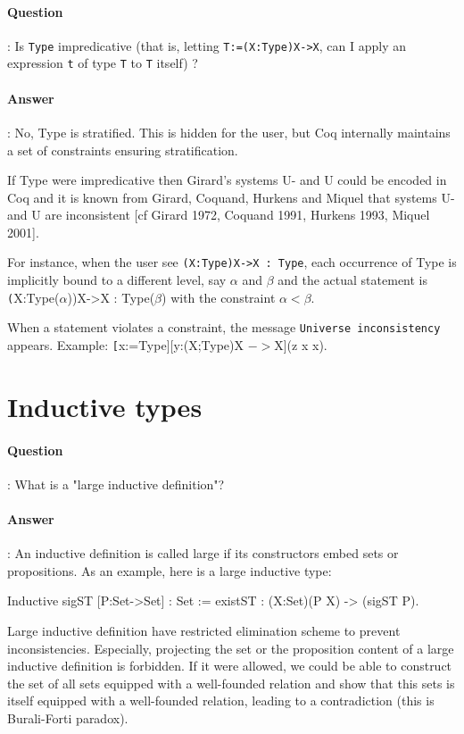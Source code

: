 \documentclass{article}
\newcommand{\coqtt}[1]{{\tt #1}}
\newcommand{\coqimp}{{$->$}}
\begin{document}
\paragraph{Question}: Is \coqtt{Type} impredicative (that is, letting
\coqtt{T:=(X:Type)X->X}, can I apply an expression \coqtt{t} of type \coqtt{T} to \coqtt{T} itself) ?

\paragraph{Answer}: No, Type is stratified. This is hidden for the
user, but Coq internally maintains a set of constraints ensuring
stratification.

  If Type were impredicative then Girard's systems U- and U could be
encoded in Coq and it is known from Girard, Coquand, Hurkens and
Miquel that systems U- and U are inconsistent [cf Girard 1972, Coquand
1991, Hurkens 1993, Miquel 2001].

  For instance, when the user see {\tt (X:Type)X->X : Type}, each
occurrence of Type is implicitly bound to a different level, say
$\alpha$ and $\beta$ and the actual statement is {\coqtt
(X:Type($\alpha$))X->X : Type($\beta$)} with the constraint
$\alpha<\beta$.

  When a statement violates a constraint, the message {\tt Universe
inconsistency} appears. Example: {\coqtt [x:=Type][y:(X;Type)X \coqimp X](z x x)}.

\section{Inductive types}

\paragraph{Question}: What is a "large inductive definition"?

\paragraph{Answer}: An inductive definition is called large if its constructors embed
sets or propositions. As an example, here is a large inductive type:

\begin{coq_example*}
  Inductive sigST [P:Set->Set] : Set
      := existST : (X:Set)(P X) -> (sigST P).
\end{coq_example*}

   Large inductive definition have restricted elimination scheme to
prevent inconsistencies. Especially, projecting the set or the
proposition content of a large inductive definition is forbidden. If
it were allowed, we could be able to construct the set of all sets
equipped with a well-founded relation and show that this sets is
itself equipped with a well-founded relation, leading to a
contradiction (this is Burali-Forti paradox).
\end{document}
